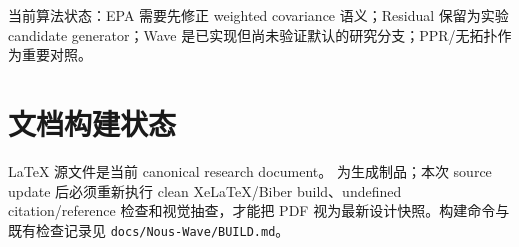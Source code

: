 当前算法状态：EPA 需要先修正 weighted covariance 语义；Residual 保留为实验 candidate generator；Wave 是已实现但尚未验证默认的研究分支；PPR/无拓扑作为重要对照。

\section{文档构建状态}

LaTeX 源文件是当前 canonical research document。 为生成制品；本次 source update 后必须重新执行 clean XeLaTeX/Biber build、undefined citation/reference 检查和视觉抽查，才能把 PDF 视为最新设计快照。构建命令与既有检查记录见 \texttt{docs/Nous-Wave/BUILD.md}。
